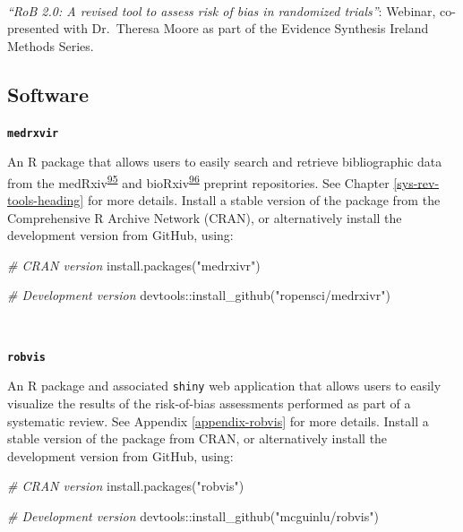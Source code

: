 \documentclass[a4paper, twoside]{templates/ociamthesis}
\newenvironment{Shaded}{\begin{snugshade}}{\end{snugshade}}
\newcommand{\CommentTok}[1]{\textcolor[rgb]{0.56,0.35,0.01}{\textit{#1}}}
\newcommand{\FunctionTok}[1]{\textcolor[rgb]{0.00,0.00,0.00}{#1}}
\newcommand{\NormalTok}[1]{#1}
\newcommand{\SpecialCharTok}[1]{\textcolor[rgb]{0.00,0.00,0.00}{#1}}
\newcommand{\StringTok}[1]{\textcolor[rgb]{0.31,0.60,0.02}{#1}}
\renewenvironment{Shaded}
{
  \vspace{4pt}%
  \begin{snugshade}%
}{%
  \end{snugshade}%
  \vspace{4pt}%
}
\begin{document}
~

\emph{``RoB 2.0: A revised tool to assess risk of bias in randomized trials''}: Webinar, co-presented with Dr.~Theresa Moore as part of the Evidence Synthesis Ireland Methods Series.

\hypertarget{outputs-software}{%
\subsection{Software}\label{outputs-software}}

\textbf{\texttt{medrxvir}}

An R package that allows users to easily search and retrieve bibliographic data from the medRxiv\textsuperscript{\protect\hyperlink{ref-rawlinson2019}{95}} and bioRxiv\textsuperscript{\protect\hyperlink{ref-sever2019}{96}} preprint repositories. See Chapter \ref{sys-rev-tools-heading} for more details. Install a stable version of the package from the Comprehensive R Archive Network (CRAN), or alternatively install the development version from GitHub, using:

\begin{Shaded}
\begin{Highlighting}[]
\CommentTok{\# CRAN version}
\FunctionTok{install.packages}\NormalTok{(}\StringTok{"medrxivr"}\NormalTok{)}

\CommentTok{\# Development version}
\NormalTok{devtools}\SpecialCharTok{::}\FunctionTok{install\_github}\NormalTok{(}\StringTok{"ropensci/medrxivr"}\NormalTok{)}
\end{Highlighting}
\end{Shaded}

~

\textbf{\texttt{robvis}}

An R package and associated \texttt{shiny} web application that allows users to easily visualize the results of the risk-of-bias assessments performed as part of a systematic review. See Appendix \ref{appendix-robvis} for more details. Install a stable version of the package from CRAN, or alternatively install the development version from GitHub, using:

\begin{Shaded}
\begin{Highlighting}[]
\CommentTok{\# CRAN version}
\FunctionTok{install.packages}\NormalTok{(}\StringTok{"robvis"}\NormalTok{)}

\CommentTok{\# Development version}
\NormalTok{devtools}\SpecialCharTok{::}\FunctionTok{install\_github}\NormalTok{(}\StringTok{"mcguinlu/robvis"}\NormalTok{)}
\end{Highlighting}
\end{Shaded}
\end{document}
